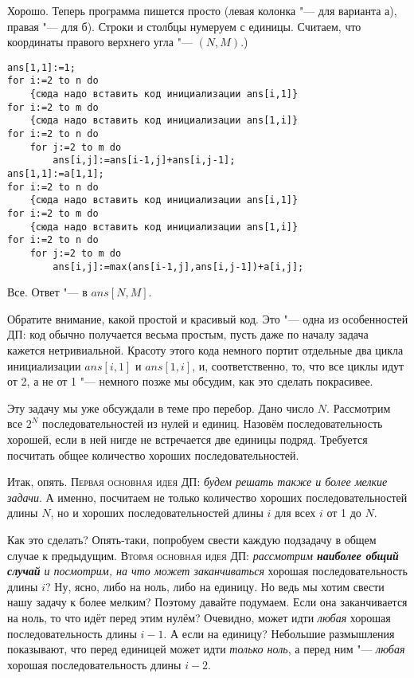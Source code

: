 Хорошо. Теперь программа пишется просто (левая колонка "--- для варианта а), правая "--- для б). 
Строки и столбцы нумеруем с единицы. Считаем, что координаты правого верхнего угла "--- $(N,M)$.)
\begin{codesample}\begin{verbatim}
ans[1,1]:=1;
for i:=2 to n do
    {сюда надо вставить код инициализации ans[i,1]}
for i:=2 to m do
    {сюда надо вставить код инициализации ans[1,i]}
for i:=2 to n do
    for j:=2 to m do
        ans[i,j]:=ans[i-1,j]+ans[i,j-1];
ans[1,1]:=a[1,1];
for i:=2 to n do
    {сюда надо вставить код инициализации ans[i,1]}
for i:=2 to m do
    {сюда надо вставить код инициализации ans[1,i]}
for i:=2 to n do
    for j:=2 to m do
        ans[i,j]:=max(ans[i-1,j],ans[i,j-1])+a[i,j];
\end{verbatim}\end{codesample}

Все. Ответ "--- в $ans[N,M]$.

Обратите внимание, какой простой и красивый код. Это "--- одна из особенностей ДП: код обычно 
получается весьма простым, пусть даже по началу задача кажется нетривиальной. Красоту этого кода 
немного портит отдельные два цикла инициализации $ans[i,1]$ и $ans[1,i]$, и, соответственно, то, 
что все циклы идут от 2, а не от 1 "--- немного позже мы обсудим, как это сделать покрасивее.

 Эту задачу мы уже обсуждали 
в теме про перебор. Дано число $N$. Рассмотрим все $2^N$ последовательностей из нулей и единиц. 
Назовём последовательность хорошей, если в ней нигде не встречается две единицы подряд. Требуется 
посчитать общее количество хороших последовательностей.

Итак, опять. \textsc{Первая основная идея ДП:} \textit{будем решать также и более мелкие задачи}. А 
именно, посчитаем не только количество хороших последовательностей длины $N$, но и хороших 
последовательностей длины $i$ для всех $i$ от 1 до $N$.

Как это сделать? Опять-таки, попробуем свести каждую подзадачу в общем случае к предыдущим. 
\textsc{Вторая основная идея ДП:} \textit{рассмотрим \textbf{наиболее общий случай} и 
посмотрим, на что может заканчиваться} хорошая последовательность длины $i$? Ну, ясно, 
либо на ноль, либо на единицу. Но ведь мы хотим свести нашу задачу к более мелким? Поэтому давайте 
подумаем. Если она заканчивается на ноль, то что идёт перед этим нулём? Очевидно, может идти 
\textit{любая} хорошая последовательность длины $i-1$. А если на единицу? Небольшие размышления 
показывают, что перед единицей может идти \textit{только ноль}, а перед ним "--- \textit{любая}
хорошая последовательность длины $i-2$.

